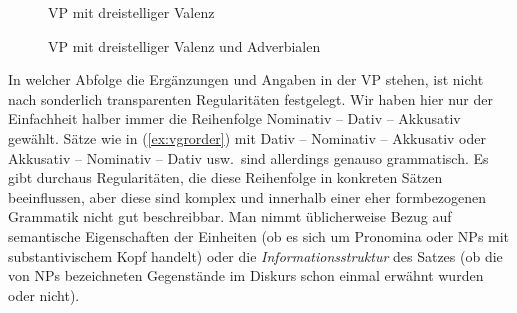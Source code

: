 \begin{figure}
  \centering
  \caption{VP mit dreistelliger Valenz}
  \label{fig:vgrdreistellig}
\end{figure}

\begin{figure}
  \caption{VP mit dreistelliger Valenz und Adverbialen}
  \label{fig:vgrdreistelligmitadv}
\end{figure}

In welcher Abfolge die Ergänzungen und Angaben in der VP stehen, ist nicht nach sonderlich transparenten Regularitäten festgelegt.
Wir haben hier nur der Einfachheit halber immer die Reihenfolge Nominativ -- Dativ -- Akkusativ gewählt.
Sätze wie in (\ref{ex:vgrorder}) mit Dativ -- Nominativ -- Akkusativ oder Akkusativ -- Nominativ -- Dativ usw.\ sind allerdings genauso grammatisch.
Es gibt durchaus Regularitäten, die diese Reihenfolge in konkreten Sätzen beeinflussen, aber diese sind komplex und innerhalb einer eher formbezogenen Grammatik nicht gut beschreibbar.
Man nimmt üblicherweise Bezug auf semantische Eigenschaften der Einheiten (\zB ob es sich um Pronomina oder NPs mit substantivischem Kopf handelt) oder die \textit{Informationsstruktur} des Satzes (\zB ob die von NPs bezeichneten Gegenstände im Diskurs schon einmal erwähnt wurden oder nicht).

\newcommand{\ThePhrasenExOne}{dass [[dem Jungen] [die Mutter] [ein Eis] [geschenkt hat]]}
\newcommand{\ThePhrasenExTwo}{dass [[ein Eis] [die Mutter] [dem Jungen] [geschenkt hat]]}

